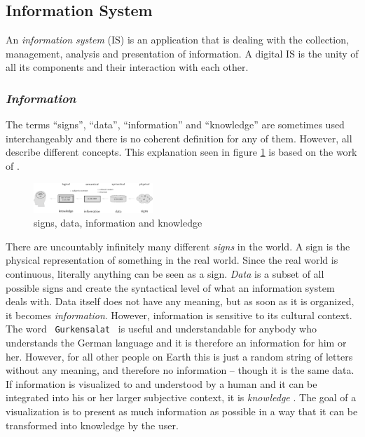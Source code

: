 

\subsection{Information System} %
\label{sub:information_system}

An \emph{information system} (IS) is an application that is dealing with the collection, management, analysis and presentation of information. A digital IS is the unity of all its components and their interaction with each other.

\subsubsection{\emph{Information}} %
\label{ssub:definition_of_information}
The terms ``signs'', ``data'', ``information'' and ``knowledge'' are sometimes used interchangeably and there is no coherent definition for any of them. However, all describe different concepts. This explanation seen in figure \ref{fig:information} is based on the work of \cite{datinfwis}.

\begin{figure}[ht]
    \begin{center}
        \includegraphics[width=0.4\textwidth]{graphics/basics/information}
    \end{center}
    \caption{signs, data, information and knowledge}
    \label{fig:information}
\end{figure}

There are uncountably infinitely many different \emph{signs} in the world. A sign is the physical representation of something in the real world. Since the real world is continuous, literally anything can be seen as a sign. \emph{Data} is a subset of all possible signs and create the syntactical level of what an information system deals with. Data itself does not have any meaning, but as soon as it is organized, it becomes \emph{information}. However, information is sensitive to its cultural context. The word ~\texttt{Gurkensalat}~ is useful and understandable for anybody who understands the German language and it is therefore an information for him or her. However, for all other people on Earth this is just a random string of letters without any meaning, and therefore no information -- though it is the same data. If information is visualized to and understood by a human and it can be integrated into his or her larger subjective context, it is \emph{knowledge} \cite{nake}. The goal of a visualization is to present as much information as possible in a way that it can be transformed into knowledge by the user.


